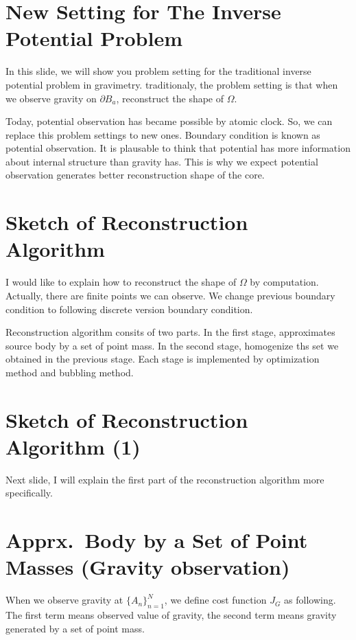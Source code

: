 \documentclass[uplatex,12pt]{jsarticle}
\begin{document}
\section{New Setting for The Inverse Potential Problem}

In this slide, we will show you problem setting for the traditional inverse potential problem in gravimetry.
traditionaly, the problem setting is that when we observe gravity on $\partial B_a$,
reconstruct the shape of $\Omega$.

Today, potential observation has became possible by atomic clock.
So, we can replace this problem settings to new ones.
Boundary condition is known as potential observation.
It is plausable to think that potential has more information about internal structure than gravity has.
This is why we expect potential observation generates better reconstruction shape of the core.

\section{Sketch of Reconstruction Algorithm}

I would like to explain how to reconstruct the shape of $\Omega$ by computation.
Actually, there are finite points we can observe.
We change previous boundary condition to following discrete version boundary condition.

Reconstruction algorithm consits of two parts.
In the first stage, approximates source body by a set of point mass.
In the second stage, homogenize ths set we obtained in the previous stage.
Each stage is implemented by optimization method and bubbling method.

\section{Sketch of Reconstruction Algorithm (1)}

Next slide, I will explain the first part of the reconstruction algorithm more specifically.

\section{Apprx.~Body by a Set of Point Masses (Gravity observation)}

When we observe gravity at $\{A_n\}_{n=1}^N$, we define cost function $J_G$ as following.
The first term means observed value of gravity, the second term means gravity generated by a set of point mass.
\end{document}

